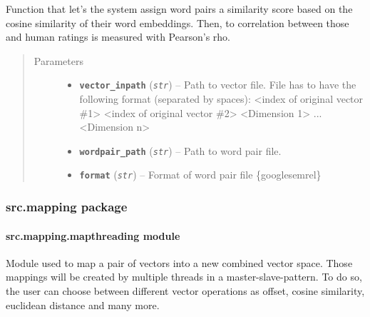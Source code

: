 \documentclass[letterpaper,10pt,english]{sphinxmanual}
\begin{document}

\begin{fulllineitems}
\label{src.eval:src.eval.word_similarity.word_sim_eval}
Function that let's the system assign word pairs a similarity score based on the cosine similarity of their word
embeddings. Then, to correlation between those and human ratings is measured with Pearson's rho.
\begin{quote}\begin{description}
\item[{Parameters}] \leavevmode\begin{itemize}
\item {} 
\textbf{\texttt{vector\_inpath}} (\emph{\texttt{str}}) -- Path to vector file. File has to have the following format (separated by spaces):
\textless{}index of original vector \#1\textgreater{} \textless{}index of original vector \#2\textgreater{} \textless{}Dimension 1\textgreater{} ... \textless{}Dimension n\textgreater{}

\item {} 
\textbf{\texttt{wordpair\_path}} (\emph{\texttt{str}}) -- Path to word pair file.

\item {} 
\textbf{\texttt{format}} (\emph{\texttt{str}}) -- Format of word pair file \{google\textbar{}semrel\}

\end{itemize}

\end{description}\end{quote}

\end{fulllineitems}



\subsubsection{src.mapping package}
\label{src.mapping::doc}\label{src.mapping:src-mapping-package}

\paragraph{src.mapping.mapthreading module}
\label{src.mapping:src-mapping-mapthreading-module}\label{src.mapping:module-src.mapping.mapthreading}
Module used to map a pair of vectors into a new combined vector space. Those mappings will be created by multiple
threads in a master-slave-pattern. To do so, the user can choose between different vector operations as offset, cosine
similarity, euclidean distance and many more.
\end{document}
